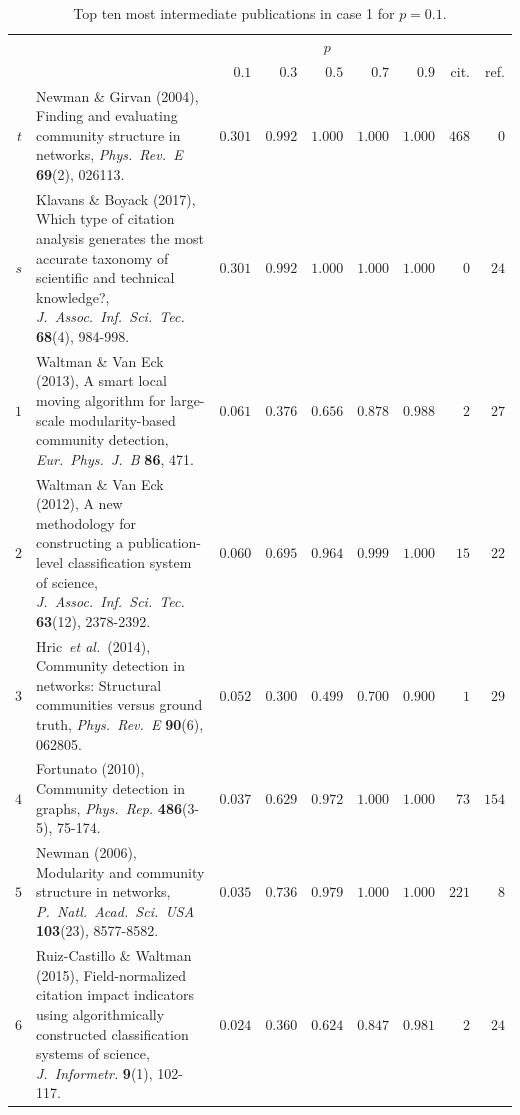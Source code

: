 \documentclass[9pt,twocolumn,twoside]{pnas-alt} %
\theoremstyle{definition}
\renewcommand{\etal}{~\emph{et al.}\xspace}
\begin{document}
\begin{sansmath}\begin{table}[b!]%
  \caption{Top ten most intermediate publications in case 1 for $p = 0.1$.}
  \begin{tabular}{rp{9.75cm}rrrrrrr}
    & & \multicolumn{5}{c}{$p$} \\\cmidrule{3-7}
    & & $0.1$ & $0.3$ & $0.5$ & $0.7$ & $0.9$ & cit. & ref. \\\midrule
    $t$ & Newman \& Girvan (2004), Finding and evaluating community structure in networks, \textit{Phys.\ Rev.\ E} \textbf{69}(2), 026113. & $0.301$ & $0.992$ & $1.000$ & $1.000$ & $1.000$ & $468$ & $0$ \\
    $s$ & Klavans \& Boyack (2017), Which type of citation analysis generates the most accurate taxonomy of scientific and technical knowledge?, \textit{J.\ Assoc.\ Inf.\ Sci.\ Tec.} \textbf{68}(4), 984-998. & $0.301$ & $0.992$ & $1.000$ & $1.000$ & $1.000$ & $0$ & $24$ \\\midrule
    $1$ & Waltman \& Van Eck (2013), A smart local moving algorithm for large-scale modularity-based community detection, \textit{Eur.\ Phys.\ J.\ B} \textbf{86}, 471. & $0.061$ & $0.376$ & $0.656$ & $0.878$ & $0.988$ & $2$ & $27$ \\
    $2$ & Waltman \& Van Eck (2012), A new methodology for constructing a publication-level classification system of science, \textit{J.\ Assoc.\ Inf.\ Sci.\ Tec.} \textbf{63}(12), 2378-2392. & $0.060$ & $0.695$ & $0.964$ & $0.999$ & $1.000$ & $15$ & $22$ \\
    $3$ & Hric\etal~(2014), Community detection in networks: Structural communities versus ground truth, \textit{Phys.\ Rev.\ E} \textbf{90}(6), 062805. & $0.052$ & $0.300$ & $0.499$ & $0.700$ & $0.900$ & $1$ & $29$ \\
    $4$ & Fortunato (2010), Community detection in graphs, \textit{Phys.\ Rep.} \textbf{486}(3-5), 75-174. & $0.037$ & $0.629$ & $0.972$ & $1.000$ & $1.000$ & $73$ & $154$ \\
    $5$ & Newman (2006), Modularity and community structure in networks, \textit{P.\ Natl.\ Acad.\ Sci.\ USA} \textbf{103}(23), 8577-8582. & $0.035$ & $0.736$ & $0.979$ & $1.000$ & $1.000$ & $221$ & $8$ \\
    $6$ & Ruiz-Castillo \& Waltman (2015), Field-normalized citation impact indicators using algorithmically constructed classification systems of science, \textit{J.\ Informetr.} \textbf{9}(1), 102-117. & $0.024$ & $0.360$ & $0.624$ & $0.847$ & $0.981$ & $2$ & $24$ \\

\end{tabular}
\end{table}
\end{sansmath}
\end{document}

